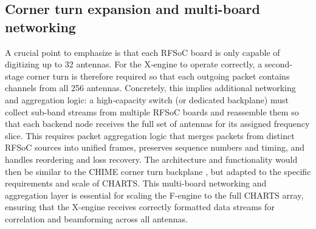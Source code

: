 \subsection{Corner turn expansion and multi-board networking}

A crucial point to emphasize is that each RFSoC board is only capable of digitizing up to 32 antennas. For the X‑engine to operate correctly, a second-stage corner turn is therefore required so that each outgoing packet contains channels from all 256 antennas. Concretely, this implies additional networking and aggregation logic: a high‑capacity switch (or dedicated backplane) must collect sub‑band streams from multiple RFSoC boards and reassemble them so that each backend node receives the full set of antennas for its assigned frequency slice. This requires packet aggregation logic that merges packets from distinct RFSoC sources into unified frames, preserves sequence numbers and timing, and handles reordering and loss recovery. The architecture and functionality would then be similar to the CHIME corner turn backplane \citep{CHIME_cornerturn_2016}, but adapted to the specific requirements and scale of CHARTS.
This multi-board networking and aggregation layer is essential for scaling the F-engine to the full CHARTS array, ensuring that the X-engine receives correctly formatted data streams for correlation and beamforming across all antennas.


